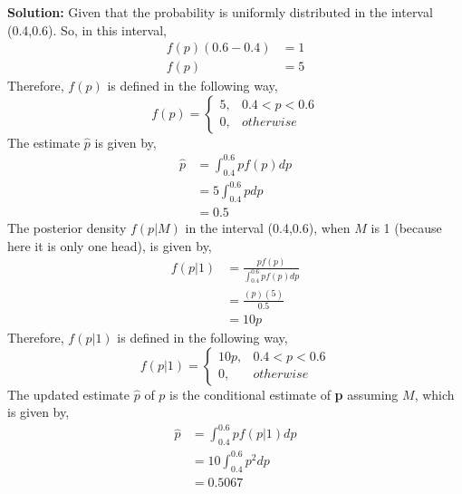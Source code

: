 \documentclass[journal,12pt,twocolumn]{IEEEtran}
\begin{document}
	\textbf{Solution:}
	Given that the probability is uniformly distributed in the interval (0.4,0.6). So, in this interval,
	\begin{align}
	          f(p)(0.6-0.4) &= 1 \\
	          f(p) &= 5
    \end{align}
    Therefore, $f(p)$ is defined in the following way,
    \begin{equation*}
           f(p)  = \begin{cases}
                    5,  & 0.4<p<0.6 \\
                    0,  & otherwise
                   \end{cases}
    \end{equation*}
    The estimate $\hat{p}$ is given by,
    \begin{align}
           \hat{p} &= \int_{0.4}^{0.6} pf(p)dp \\
                   &= 5\int_{0.4}^{0.6} pdp \\
                   &= 0.5
    \end{align} 
    The posterior density $f(p|M)$ in the interval (0.4,0.6), when $M$ is 1 (because here it is only one head), is given by,
    \begin{align}
           f(p|1) &= \frac{pf(p)}{\int_{0.4}^{0.6}pf(p)dp} \\
                  &= \frac{(p)(5)}{0.5} \\
                  &= 10p
    \end{align}
    Therefore, $f(p|1)$ is defined in the following way,
    \begin{equation*}
           f(p|1)  = \begin{cases}
                    10p,  & 0.4<p<0.6 \\
                    0,  & otherwise
                   \end{cases}
    \end{equation*}
    The updated estimate $\hat{p}$ of $p$ is the conditional estimate of \textbf{p} assuming $M$, which is given by,
    \begin{align}
           \hat{p} &= \int_{0.4}^{0.6} pf(p|1)dp \\
                   &= 10\int_{0.4}^{0.6} p^2dp \\
                   &= 0.5067
    \end{align}
\end{document}
